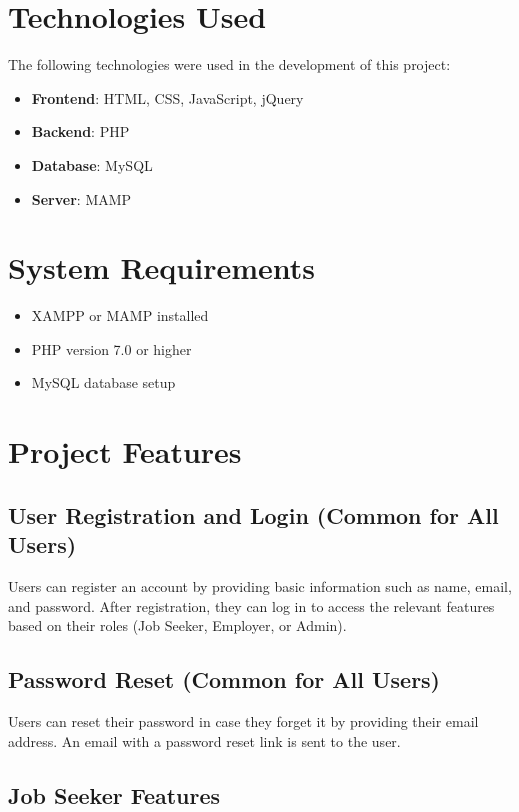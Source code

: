 \documentclass[a4paper,12pt]{article}
\begin{document}
\newpage

\section{Technologies Used}
The following technologies were used in the development of this project:

\begin{itemize}
    \item \textbf{Frontend}: HTML, CSS, JavaScript, jQuery
    \item \textbf{Backend}: PHP
    \item \textbf{Database}: MySQL
    \item \textbf{Server}: MAMP
\end{itemize}

\newpage

\section{System Requirements}
\begin{itemize}
    \item XAMPP or MAMP installed
    \item PHP version 7.0 or higher
    \item MySQL database setup
\end{itemize}

\newpage

\section{Project Features}

\subsection{User Registration and Login (Common for All Users)}
Users can register an account by providing basic information such as name, email, and password. After registration, they can log in to access the relevant features based on their roles (Job Seeker, Employer, or Admin).

\subsection{Password Reset (Common for All Users)}
Users can reset their password in case they forget it by providing their email address. An email with a password reset link is sent to the user.

\subsection{Job Seeker Features}
\end{document}

